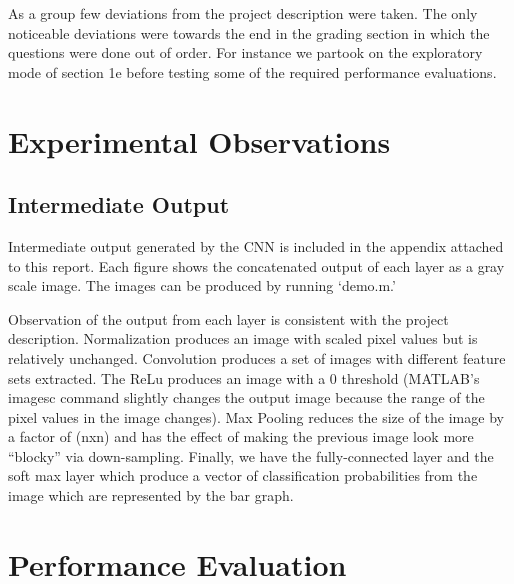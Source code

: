 \documentclass[11pt,english]{article}
\begin{document}
As a group few deviations from the project description were taken. The only noticeable deviations were towards the end in the grading section in which the questions were done out of order. For instance we partook on the exploratory mode of section 1e before testing some of the required performance evaluations.

\newpage


\section{Experimental Observations}

\subsection{Intermediate Output}

Intermediate output generated by the CNN is included in the appendix attached to this report.  Each figure shows the concatenated output of each layer as a gray scale image.  The images can be produced by running `demo.m.'

Observation of the output from each layer is consistent with the project description.  Normalization produces an image with scaled pixel values but is relatively unchanged.  Convolution produces a set of images with different feature sets extracted.  The ReLu produces an image with a 0 threshold (MATLAB's imagesc command slightly changes the output image because the range of the pixel values in the image changes).  Max Pooling reduces the size of the image by a factor of (nxn) and has the effect of making the previous image look more ``blocky'' via down-sampling.  Finally, we have the fully-connected layer and the soft max layer which produce a vector of classification probabilities from the image which are represented by the bar graph.

\section{Performance Evaluation}
\end{document}
